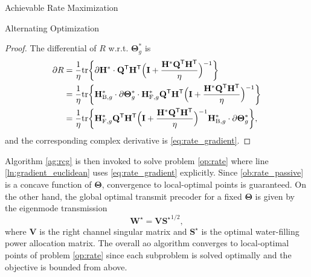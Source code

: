 \documentclass[journal]{IEEEtran}
\begin{document}
\begin{section}{Achievable Rate Maximization}
\begin{subsection}{Alternating Optimization}
		\begin{proof}
			The differential of $R$ w.r.t. $\mathbf{\Theta}_g^*$ is \cite{Hjorungnes2007}
			\begin{align*}
				\partial R
				& = \frac{1}{\eta} \mathrm{tr} \biggl\{ \partial \mathbf{H}^* \cdot \mathbf{Q}^\mathsf{T} \mathbf{H}^\mathsf{T} \Bigl(\mathbf{I} + \frac{\mathbf{H}^* \mathbf{Q}^\mathsf{T} \mathbf{H}^\mathsf{T}}{\eta}\Bigr)^{-1} \biggr\}\\
				& = \frac{1}{\eta} \mathrm{tr} \biggl\{ \mathbf{H}_{\mathrm{B},g}^* \cdot \partial \mathbf{\Theta}_g^* \cdot \mathbf{H}_{\mathrm{F},g}^* \mathbf{Q}^\mathsf{T} \mathbf{H}^\mathsf{T} \Bigl(\mathbf{I} + \frac{\mathbf{H}^* \mathbf{Q}^\mathsf{T} \mathbf{H}^\mathsf{T}}{\eta}\Bigr)^{-1} \biggr\}\\
				& = \frac{1}{\eta} \mathrm{tr} \biggl\{ \mathbf{H}_{\mathrm{F},g}^* \mathbf{Q}^\mathsf{T} \mathbf{H}^\mathsf{T} \Bigl(\mathbf{I} + \frac{\mathbf{H}^* \mathbf{Q}^\mathsf{T} \mathbf{H}^\mathsf{T}}{\eta}\Bigr)^{-1} \mathbf{H}_{\mathrm{B},g}^* \cdot \partial \mathbf{\Theta}_g^* \biggr\},
			\end{align*}
			and the corresponding complex derivative is \eqref{eq:rate_gradient}.
		\end{proof}
		Algorithm \ref{ag:rcg} is then invoked to solve problem \eqref{op:rate} where line \ref{ln:gradient_euclidean} uses \eqref{eq:rate_gradient} explicitly.
		Since \eqref{ob:rate_passive} is a concave function of $\mathbf{\Theta}$, convergence to local-optimal points is guaranteed.
		On the other hand, the global optimal transmit precoder for a fixed $\mathbf{\Theta}$ is given by the eigenmode transmission \cite{Clerckx2013}
		\begin{equation}
			\mathbf{W}^\star = \mathbf{V} {\mathbf{S}^\star}^{1/2},
			\label{eq:precoder_eigenmode}
		\end{equation}
		where $\mathbf{V}$ is the right channel singular matrix and $\mathbf{S}^\star$ is the optimal water-filling power allocation matrix.
		The overall \gls{ao} algorithm converges to local-optimal points of problem \eqref{op:rate} since each subproblem is solved optimally and the objective is bounded from above.
	\end{subsection}


\end{section}
\end{document}
